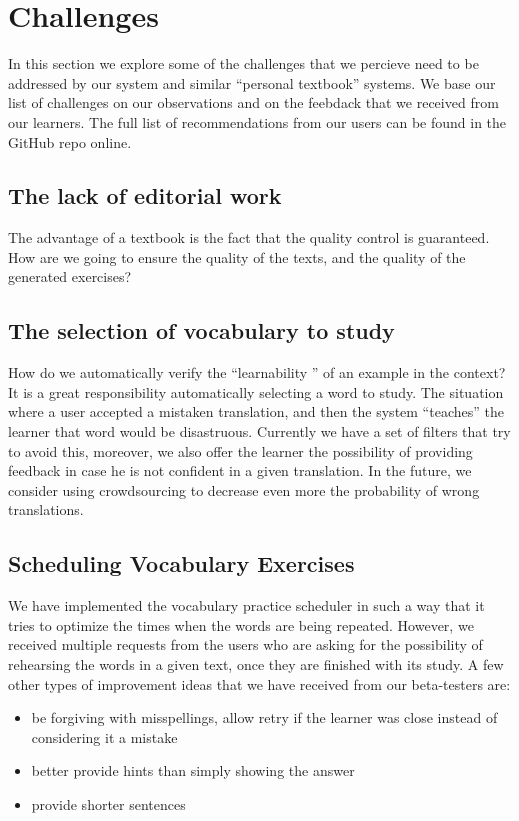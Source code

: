 

\newpage
\section{Challenges}
\label{sec:challenges}

In this section we explore some of the challenges that we percieve need to be addressed by our system and similar ``personal textbook'' systems. We base our list of challenges on our observations and on the feebdack that we received from our learners. The full list of recommendations from our users can be found in the GitHub repo online.

\subsection{The lack of editorial work}
The advantage of a textbook is the fact that the quality control is guaranteed. How are we going to ensure the quality of the texts, and the quality of the generated exercises? 

\subsection{The selection of vocabulary to study}

How do we automatically verify the ``learnability '' of an example in the context? It is a great responsibility automatically selecting a word to study. The situation where a user accepted a mistaken translation, and then the system ``teaches'' the learner that word would be disastruous. Currently we have a set of filters that try to avoid this, moreover, we also offer the learner the possibility of providing feedback in case he is not confident in a given translation. In the future, we consider using crowdsourcing to decrease even more the probability of wrong translations.

\subsection{Scheduling Vocabulary Exercises}
We have implemented the vocabulary practice scheduler in such a way that it tries to optimize the times when the words are being repeated. However, we received multiple requests from the users who are asking for the possibility of rehearsing the words in a given text, once they are finished with its study. A few other types of improvement ideas that we have received from our beta-testers are: 
\begin{itemize}
	\item be forgiving with misspellings, allow retry if the learner was close instead of considering it a mistake
	\item better provide hints than simply showing the answer
	\item provide shorter sentences
\end{itemize}


